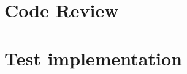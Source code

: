 \documentclass[11pt]{article}
\begin{document}
\pagebreak
\section{Code Review}


\pagebreak
\section{Test implementation}











% 


% 






\end{document}
